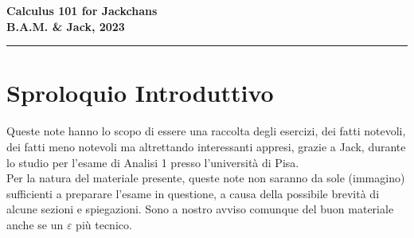 \documentclass[a4paper,twoside]{article}
\renewcommand{\epsilon}{\varepsilon}
\theoremstyle{definition}
\numberwithin{theorem}{section}
\begin{document}
\setlength\parindent{0pt}
\thispagestyle{empty}
\begin{center}{\large \textbf{ {\Huge Calculus 101 for Jackchans} \\
B.A.M. \& Jack, 2023}}
\end{center}
\rule{\textwidth}{1pt}
\tableofcontents

\section{Sproloquio Introduttivo}
    Queste note hanno lo scopo di essere una raccolta degli esercizi, dei fatti notevoli, dei fatti meno notevoli ma altrettando interessanti appresi, grazie a Jack, durante lo studio per l'esame di Analisi 1 presso l'università di Pisa.
    \\
    Per la natura del materiale presente, queste note non saranno da sole (immagino) sufficienti a preparare l'esame in questione, a causa della possibile brevità di alcune sezioni e spiegazioni. Sono a nostro avviso comunque del buon materiale anche se un $\epsilon$ più tecnico.  
    \\
\end{document}

